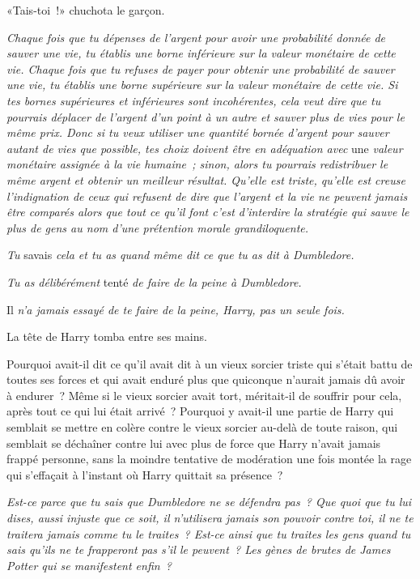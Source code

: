 «Tais-toi~!» chuchota le garçon.

\emph{Chaque fois que tu dépenses de l'argent pour avoir une probabilité donnée de sauver une vie, tu établis une borne inférieure sur la valeur monétaire de cette vie. Chaque fois que tu refuses de payer pour obtenir une probabilité de sauver une vie, tu établis une borne supérieure sur la valeur monétaire de cette vie. Si tes bornes supérieures et inférieures sont incohérentes, cela veut dire que tu pourrais déplacer de l'argent d'un point à un autre et sauver plus de vies pour le même prix. Donc si tu veux utiliser une quantité bornée d'argent pour sauver autant de vies que possible, tes choix doivent être en adéquation avec} une \emph{valeur monétaire assignée à la vie humaine~; sinon, alors tu pourrais redistribuer le même argent et obtenir un meilleur résultat. Qu'elle est triste, qu'elle est creuse l'indignation de ceux qui refusent de dire que l'argent et la vie ne peuvent jamais être comparés alors que tout ce qu'il font c'est d'interdire la stratégie qui sauve le plus de gens au nom d'une prétention morale grandiloquente.}

\emph{Tu} savais \emph{cela et tu as quand même dit ce que tu as dit à Dumbledore.}

\emph{Tu as délibérément} tenté \emph{de faire de la peine à Dumbledore.}

Il \emph{n'a jamais essayé de te faire de la peine, Harry, pas un seule fois.}

La tête de Harry tomba entre ses mains.

Pourquoi avait-il dit ce qu'il avait dit à un vieux sorcier triste qui s'était battu de toutes ses forces et qui avait enduré plus que quiconque n'aurait jamais dû avoir à endurer~? Même si le vieux sorcier avait tort, méritait-il de souffrir pour cela, après tout ce qui lui était arrivé~? Pourquoi y avait-il une partie de Harry qui semblait se mettre en colère contre le vieux sorcier au-delà de toute raison, qui semblait se déchaîner contre lui avec plus de force que Harry n'avait jamais frappé personne, sans la moindre tentative de modération une fois montée la rage qui s'effaçait à l'instant où Harry quittait sa présence~?

\emph{Est-ce parce que tu sais que Dumbledore ne se défendra pas~? Que quoi que tu lui dises, aussi injuste que ce soit, il n'utilisera jamais son pouvoir contre toi, il ne te traitera jamais comme tu le traites~? Est-ce ainsi que tu traites les gens quand tu sais qu'ils ne te frapperont pas s'il le peuvent~? Les gènes de brutes de James Potter qui se manifestent enfin~?}


